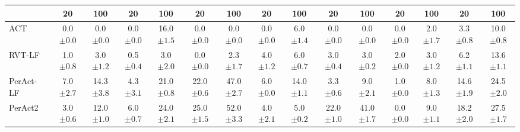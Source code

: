 \begin{table}[ht]
{\begin{tabular}{l|cc|cc|cc|cc|cc|cc|cc}
    \cmidrule(lr){2-3}\cmidrule(lr){4-5}\cmidrule(lr){6-7}\cmidrule(lr){8-9}\cmidrule(lr){10-11}\cmidrule(lr){12-13}\cmidrule(lr){14-15}
    & 20 & 100 & 20 & 100 & 20 & 100 & 20 & 100 & 20 & 100 & 20 & 100 & 20 & 100 \\
    \midrule
   ACT~\cite{zhao2023learning}  & 0.0\textcolor[gray]{0.5}{\small{$\pm0.0$}} & 0.0\textcolor[gray]{0.5}{\small{$\pm0.0$}} & 0.0\textcolor[gray]{0.5}{\small{$\pm0.0$}} & 16.0\textcolor[gray]{0.5}{\small{$\pm1.5$}} & 0.0\textcolor[gray]{0.5}{\small{$\pm0.0$}} & 0.0\textcolor[gray]{0.5}{\small{$\pm0.0$}} & 0.0\textcolor[gray]{0.5}{\small{$\pm0.0$}} & 6.0\textcolor[gray]{0.5}{\small{$\pm1.4$}} & 0.0\textcolor[gray]{0.5}{\small{$\pm0.0$}} & 0.0\textcolor[gray]{0.5}{\small{$\pm0.0$}} & 0.0\textcolor[gray]{0.5}{\small{$\pm0.0$}} & 2.0\textcolor[gray]{0.5}{\small{$\pm1.7$}} & 3.3\textcolor[gray]{0.5}{\small{$\pm0.8$}} & 10.0\textcolor[gray]{0.5}{\small{$\pm0.8$}} \\
    RVT-LF~\cite{goyal2023rvt,grotz2024peract2} & 1.0\textcolor[gray]{0.5}{\small{$\pm0.8$}} & 3.0\textcolor[gray]{0.5}{\small{$\pm1.2$}} & 0.5\textcolor[gray]{0.5}{\small{$\pm0.4$}} & 3.0\textcolor[gray]{0.5}{\small{$\pm2.0$}} & 0.0\textcolor[gray]{0.5}{\small{$\pm0.0$}} & 2.3\textcolor[gray]{0.5}{\small{$\pm1.7$}} & 4.0\textcolor[gray]{0.5}{\small{$\pm1.2$}} & 6.0\textcolor[gray]{0.5}{\small{$\pm0.7$}} & 3.0\textcolor[gray]{0.5}{\small{$\pm0.4$}} & 3.0\textcolor[gray]{0.5}{\small{$\pm0.2$}} & 2.0\textcolor[gray]{0.5}{\small{$\pm0.0$}} & 3.0\textcolor[gray]{0.5}{\small{$\pm1.2$}} & 6.2\textcolor[gray]{0.5}{\small{$\pm1.1$}} & 13.6\textcolor[gray]{0.5}{\small{$\pm1.1$}} \\
    PerAct-LF~\cite{grotz2024peract2,shridhar2023perceiver} & 7.0\textcolor[gray]{0.5}{\small{$\pm2.7$}} & 14.3\textcolor[gray]{0.5}{\small{$\pm3.8$}} & 4.3\textcolor[gray]{0.5}{\small{$\pm3.1$}} & 21.0\textcolor[gray]{0.5}{\small{$\pm0.8$}} & 22.0\textcolor[gray]{0.5}{\small{$\pm0.6$}} & 47.0\textcolor[gray]{0.5}{\small{$\pm2.7$}} & 6.0\textcolor[gray]{0.5}{\small{$\pm0.0$}} & 14.0\textcolor[gray]{0.5}{\small{$\pm1.1$}} & 3.3\textcolor[gray]{0.5}{\small{$\pm0.6$}} & 9.0\textcolor[gray]{0.5}{\small{$\pm2.1$}} & 1.0\textcolor[gray]{0.5}{\small{$\pm0.0$}} & 8.0\textcolor[gray]{0.5}{\small{$\pm1.3$}} & 14.6\textcolor[gray]{0.5}{\small{$\pm1.9$}} & 24.5\textcolor[gray]{0.5}{\small{$\pm2.0$}} \\
    PerAct2~\cite{grotz2024peract2} & 3.0\textcolor[gray]{0.5}{\small{$\pm0.6$}} & 12.0\textcolor[gray]{0.5}{\small{$\pm1.0$}} & 6.0\textcolor[gray]{0.5}{\small{$\pm0.7$}} & 24.0\textcolor[gray]{0.5}{\small{$\pm2.1$}} & 25.0\textcolor[gray]{0.5}{\small{$\pm1.5$}} & 52.0\textcolor[gray]{0.5}{\small{$\pm3.3$}} & 4.0\textcolor[gray]{0.5}{\small{$\pm2.1$}} & 5.0\textcolor[gray]{0.5}{\small{$\pm0.2$}} & 22.0\textcolor[gray]{0.5}{\small{$\pm1.0$}} & 41.0\textcolor[gray]{0.5}{\small{$\pm1.7$}} & 0.0\textcolor[gray]{0.5}{\small{$\pm0.0$}} & 9.0\textcolor[gray]{0.5}{\small{$\pm1.1$}} & 18.2\textcolor[gray]{0.5}{\small{$\pm2.0$}} & 27.5\textcolor[gray]{0.5}{\small{$\pm1.7$}} \\

\end{tabular}}
\end{table}
